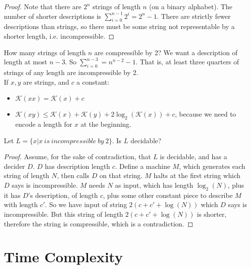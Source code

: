 \begin{proof}
	Note that there are $2^n$ strings of length $n$ (on a binary alphabet).  The number of shorter descriptions is $\sum\limits_{i=0}^{n-1} 2^i = 2^n - 1$.  There are strictly fewer descriptions than strings, so there must be some string not representable by a shorter length, i.e. incompressible.
	
\end{proof}

How many strings of length $n$ are compressible by 2?  We want a description of length at most $n-3$.  So $\sum\limits_{i=0}^{n-3} = n^{n-2} -1$.  That is, at least three quarters of strings of any length are incompressible by 2.\\

If $x,y$ are strings, and $c$ a constant:  
\begin{itemize}
\item $\mathcal{K}(xx) = \mathcal{K}(x) + c$
\item $\mathcal{K}(xy) \leq \mathcal{K}(x) + \mathcal{K}(y) + 2\log_2(\mathcal{K}(x)) + c$, because we need to encode a length for $x$ at the beginning.
\end{itemize}

Let $L = \{ x | x \ is \ incompressible \ by \ 2\}$.  Is $L$ decidable?


\begin{proof}
	
	Assume, for the sake of contradiction, that $L$ is decidable, and has a decider $D$.  $D$ has description length $c$.  Define a machine $M$, which generates each string of length $N$, then calls $D$ on that string.  $M$ halts at the first string which $D$ says is incompressible.  $M$ needs $N$ as input, which has length $\log_2(N)$, plus it has $D$'s description, of length $c$, plus some other constant piece to describe $M$ with length $c'$.  So we have input of string $2(c+c'+\log(N))$ which $D$ says is incompressible.  But this string of length $2(c+c'+\log(N))$ is shorter, therefore the string is compressible, which is a contradiction.
	
	
	
\end{proof}

\section*{Time Complexity}


